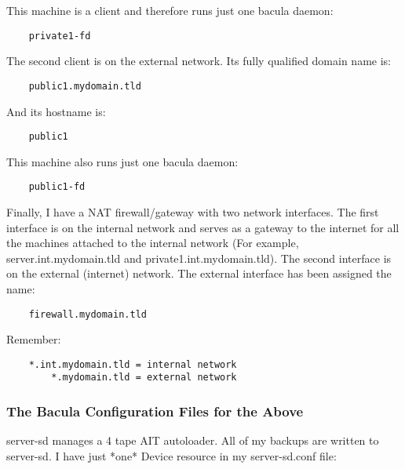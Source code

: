 This machine is a client and therefore runs just one bacula daemon: 

\footnotesize
\begin{verbatim}
    private1-fd
\end{verbatim}
\normalsize

The second client is on the external network. Its fully qualified domain name
is: 

\footnotesize
\begin{verbatim}
    public1.mydomain.tld
\end{verbatim}
\normalsize

And its hostname is: 

\footnotesize
\begin{verbatim}
    public1
\end{verbatim}
\normalsize

This machine also runs just one bacula daemon: 

\footnotesize
\begin{verbatim}
    public1-fd
\end{verbatim}
\normalsize

Finally, I have a NAT firewall/gateway with two network interfaces. The first
interface is on the internal network and serves as a gateway to the internet
for all the machines attached to the internal network (For example,
server.int.mydomain.tld and private1.int.mydomain.tld). The second interface
is on the external (internet) network. The external interface has been
assigned the name: 

\footnotesize
\begin{verbatim}
    firewall.mydomain.tld
\end{verbatim}
\normalsize

Remember: 

\footnotesize
\begin{verbatim}
    *.int.mydomain.tld = internal network
        *.mydomain.tld = external network
\end{verbatim}
\normalsize

\subsubsection*{The Bacula Configuration Files for the Above}

server-sd manages a 4 tape AIT autoloader. All of my backups are written to
server-sd. I have just *one* Device resource in my server-sd.conf file: 

